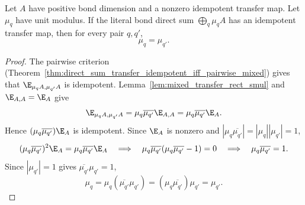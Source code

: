 \begin{theorem}%
    \label{thm:literal_repeated_blocks_phase_coherence}
    \leanok
    Let $A$ have positive bond dimension and a nonzero idempotent transfer map.
    Let $\mu_q$ have unit modulus. If the literal bond direct sum
    $\bigoplus_q \mu_qA$ has an idempotent transfer map, then for every pair
    $q,q'$,
    \[
        \mu_q=\mu_{q'}.
    \]
\end{theorem}
\begin{proof}\leanok
    The pairwise criterion
    (Theorem~\ref{thm:direct_sum_transfer_idempotent_iff_pairwise_mixed})
    gives that $\E_{\mu_qA,\mu_{q'}A}$ is idempotent.
    Lemma~\ref{lem:mixed_transfer_rect_smul} and
    $\E_{A,A}=\E_A$ give
    \[
        \E_{\mu_qA,\mu_{q'}A}
        =\mu_q\overline{\mu_{q'}}\E_{A,A}
        =\mu_q\overline{\mu_{q'}}\E_A.
    \]
    Hence $(\mu_q\overline{\mu_{q'}})\E_A$ is idempotent. Since $\E_A$ is
    nonzero and
    $|\mu_q\overline{\mu_{q'}}|=|\mu_q||\mu_{q'}|=1$,
    \[
        (\mu_q\overline{\mu_{q'}})^2\E_A
        =\mu_q\overline{\mu_{q'}}\E_A
        \quad\Longrightarrow\quad
        \mu_q\overline{\mu_{q'}}
        (\mu_q\overline{\mu_{q'}}-1)=0
        \quad\Longrightarrow\quad
        \mu_q\overline{\mu_{q'}}=1.
    \]
    Since $|\mu_{q'}|=1$ gives
    $\overline{\mu_{q'}}\mu_{q'}=1$,
    \[
        \mu_q
        =\mu_q(\overline{\mu_{q'}}\mu_{q'})
        =(\mu_q\overline{\mu_{q'}})\mu_{q'}
        =\mu_{q'}.
    \]

\end{proof}

